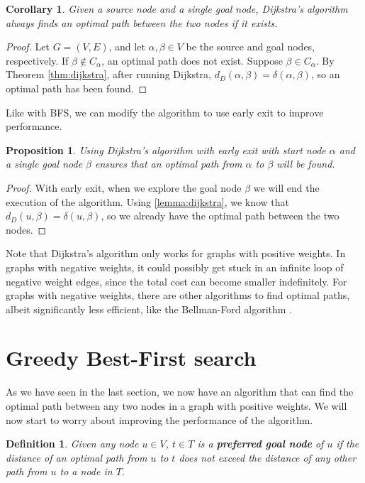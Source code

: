 \documentclass[a4paper,10pt]{report}
\newtheorem{definition}[theorem]{Definition}
\newtheorem{proposition}[theorem]{Proposition}
\newtheorem{corollary}[theorem]{Corollary}
\begin{document}
\begin{corollary}
Given a source node and a single goal node, Dijkstra's algorithm always finds an optimal path between the two nodes if it exists.
\end{corollary}
\begin{proof}
Let $G = (V, E)$, and let $\alpha, \beta \in V$ be the source and goal nodes, respectively. If $\beta \not \in C_\alpha$, an optimal path does not exist. Suppose $\beta \in C_\alpha$. By Theorem \ref{thm:dijkstra}, after running Dijkstra, $d_D(\alpha, \beta) = \delta(\alpha, \beta)$, so an optimal path has been found.
\end{proof}

Like with BFS, we can modify the algorithm to use early exit to improve performance.
\begin{proposition}
Using Dijkstra's algorithm with early exit with start node $\alpha$ and a single goal node $\beta$ ensures that an optimal path from $\alpha$ to $\beta$ will be found.
\end{proposition}
\begin{proof}
With early exit, when we explore the goal node $\beta$ we will end the execution of the algorithm. Using \ref{lemma:dijkstra}, we know that $d_D(u, \beta) = \delta(u, \beta)$, so we already have the optimal path between the two nodes.
\end{proof}

Note that Dijkstra's algorithm only works for graphs with positive weights. In graphs with negative weights, it could possibly get stuck in an infinite loop of negative weight edges, since the total cost can become smaller indefinitely. For graphs with negative weights, there are other algorithms to find optimal paths, albeit significantly less efficient, like the Bellman-Ford algorithm \cite{bellman-ford}.

\section{Greedy Best-First search}
\label{section:greedy}
As we have seen in the last section, we now have an algorithm that can find the optimal path between any two nodes in a graph with positive weights. We will now start to worry about improving the performance of the algorithm.

\begin{definition}
Given any node $u \in V$, $t \in T$ is a \textbf{preferred goal node} of $u$ if the distance of an optimal path from $u$ to $t$ does not exceed the distance of any other path from $u$ to a node in $T$.
\end{definition}
\end{document}

